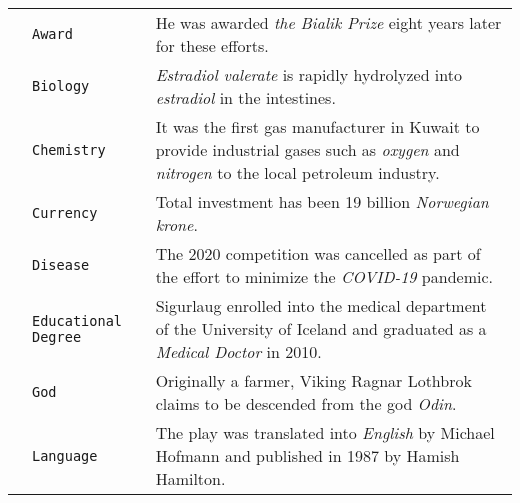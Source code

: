\documentclass[11pt,a4paper, dvipsnames]{article}
\begin{document}
\begin{longtable}{clp{9.5cm}}
                                              & \texttt{\color{Brown}Award}               & He was awarded \textit{\color{Brown}the Bialik Prize} eight years later for these efforts.                                                                           \\ \cmidrule(r){2-2} \cmidrule(r){3-3}
                                              & \texttt{\color{Brown}Biology}             & \textit{\color{Brown}Estradiol valerate} is rapidly hydrolyzed into \textit{\color{Brown}estradiol} in the intestines.                                                               \\ \cmidrule(r){2-2} \cmidrule(r){3-3}
                                              & \texttt{\color{Brown}Chemistry}           & It was the first gas manufacturer in Kuwait to provide industrial gases such as \textit{\color{Brown}\color{Brown}oxygen} and \textit{\color{Brown}nitrogen} to the local petroleum industry.     \\ \cmidrule(r){2-2} \cmidrule(r){3-3}
                                              & \texttt{\color{Brown}Currency}            & Total investment has been 19 billion \textit{\color{Brown}Norwegian krone}.                                                                                          \\ \cmidrule(r){2-2} \cmidrule(r){3-3}
                                              & \texttt{\color{Brown}Disease}             & The 2020 competition was cancelled as part of the effort to minimize the \textit{\color{Brown}COVID-19} pandemic.                                                    \\ \cmidrule(r){2-2} \cmidrule(r){3-3}
                                              & \texttt{\color{Brown}Educational Degree} & Sigurlaug enrolled into the medical department of the University of Iceland and graduated as a \textit{\color{Brown}Medical Doctor} in 2010.                         \\ \cmidrule(r){2-2} \cmidrule(r){3-3}
                                              & \texttt{\color{Brown}God}                 & Originally a farmer, Viking Ragnar Lothbrok claims to be descended from the god \textit{\color{Brown}Odin}.                                                          \\ \cmidrule(r){2-2} \cmidrule(r){3-3}
                                              & \texttt{\color{Brown}Language}            & The play was translated into \textit{\color{Brown}English} by Michael Hofmann and published in 1987 by Hamish Hamilton.                                              \\ \cmidrule(r){2-2} \cmidrule(r){3-3}

\end{longtable}
\end{document}
